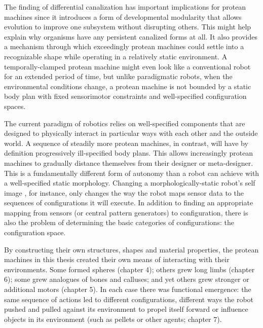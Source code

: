 The finding of differential canalization has important implications
for protean machines since it introduces a form of developmental modularity
that
allows evolution to improve one subsystem without disrupting others.
This might help explain why organisms have any persistent canalized forms at all.
It also provides a mechanism through which exceedingly protean machines could settle into a recognizable shape while operating in a relatively static environment.
A temporally-clamped protean machine might even look like a conventional robot for an extended period of time, but unlike paradigmatic robots, when the environmental conditions change, a protean machine is not bounded by a static body plan with fixed sensorimotor constraints and well-specified configuration spaces.

The current paradigm of robotics relies on well-specified components that are designed to physically interact in particular ways with each other and the outside world.
A sequence of steadily more protean machines, in contrast, will have by definition progressively ill-specified body plans.
This allows increasingly protean machines to gradually distance themselves from their designer or meta-designer.
This is a fundamentally different form of autonomy than a robot can achieve with a well-specified static morphology.
Changing a morphologically-static robot's self image \cite{bongard2006resilient,cully2015robots}, for instance, 
only changes the way the robot maps sensor data to 
the sequences of configurations it will execute.
In addition to finding an appropriate mapping from sensors (or central pattern generators) to configuration, 
there is also the problem of determining the basic categories of configurations: the configuration space.

By constructing their own structures, shapes and material properties, 
the protean machines in this thesis created their own means of interacting with their environments.
Some formed spheres (chapter 4); others grew long limbs (chapter 6); 
some grew analogues of bones and calluses; and yet others grew stronger or additional motors (chapter 5).
In each case there was functional emergence: 
the same sequence of actions led to different configurations, different ways the robot pushed and pulled against its environment to propel itself forward or influence objects in its environment (such as pellets or other agents; chapter 7).


